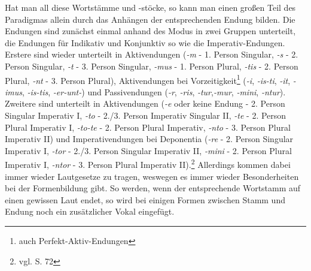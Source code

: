 Hat man all diese Wortstämme und -stöcke, so kann man einen großen Teil des Paradigmas allein durch das Anhängen der entsprechenden Endung bilden. Die Endungen sind zunächst einmal anhand des Modus in zwei Gruppen unterteilt, die Endungen für Indikativ und Konjunktiv so wie die Imperativ-Endungen. Erstere sind wieder unterteilt in Aktivendungen (\textit{-m} - 1. Person Singular, \textit{-s} - 2. Person Singular, \textit{-t} - 3. Person Singular, \textit{-mus} - 1. Person Plural, \textit{-tis} - 2. Person Plural, \textit{-nt} - 3. Person Plural), Aktivendungen bei Vorzeitigkeit\footnote{auch Perfekt-Aktiv-Endungen} (\textit{-i}, \textit{-is-ti}, \textit{-it}, \textit{-imus}, \textit{-is-tis}, \textit{-er-unt-}) und Passivendungen (\textit{-r}, \textit{-ris}, \textit{-tur},\textit{-mur}, \textit{-mini}, \textit{-ntur}). Zweitere sind unterteilt in Aktivendungen (\textit{-e} oder keine Endung - 2. Person Singular Imperativ I, \textit{-to} - 2./3. Person Imperativ Singular II, \textit{-te} - 2. Person Plural Imperativ I, \textit{-to-te} - 2. Person Plural Imperativ, \textit{-nto} - 3. Person Plural Imperativ II) und Imperativendungen bei Deponentia (\textit{-re} - 2. Person Singular Imperativ I, \textit{-tor} - 2./3. Person Singular Imperativ II, \textit{-mini} - 2. Person Plural Imperativ I, \textit{-ntor} - 3. Person Plural Imperativ II).\footnote{vgl. \cite{BAYER-LINDAUER1994} S. 72} Allerdings kommen dabei immer wieder Lautgesetze zu tragen, weswegen es immer wieder Besonderheiten bei der Formenbildung gibt. So werden, wenn der entsprechende Wortstamm auf einen gewissen Laut endet, so wird bei einigen Formen zwischen Stamm und Endung noch ein zusätzlicher Vokal eingefügt. \par

